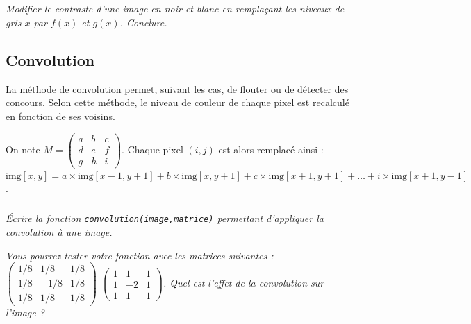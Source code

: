 \documentclass[10pt,fleqn]{article} %
\begin{document}
\begin{multicols}{2}
\subparagraph{}\textit{Modifier le contraste d'une image en noir et blanc en remplaçant les niveaux de gris $x$ par $f(x)$ et $g(x)$. Conclure.}

\subsection*{Convolution}
La méthode de convolution permet, suivant les cas, de flouter ou de détecter des concours. 
Selon cette méthode, le niveau de couleur de chaque pixel est recalculé en fonction de ses voisins. 


On note $M=\begin{pmatrix} a & b & c \\ d & e & f \\ g & h & i \end{pmatrix}$. Chaque pixel $(i,j)$ est alors remplacé ainsi : $\text{img}[x, y] = a \times \text{img}[x-1, y+1] + b \times \text{img}[x, y+1]+ c \times \text{img}[x+1, y+1] + \ldots + i \times \text{img}[x+1, y-1]$.

\subparagraph{}\textit{Écrire la fonction \texttt{convolution(image,matrice)} permettant d'appliquer la convolution à une image.}

\textit{Vous pourrez tester votre fonction avec les matrices suivantes : 
$\begin{pmatrix} 1/8 & 1/8 & 1/8 \\ 1/8 & -1/8 & 1/8 \\ 1/8 & 1/8 & 1/8 \end{pmatrix}$ 
$\begin{pmatrix} 1 & 1 & 1 \\ 1 & -2 & 1 \\ 1 & 1 & 1 \end{pmatrix}$. Quel est l'effet de la convolution sur l'image ?}


\ifprof
\else
\end{multicols}
\fi
\end{document}
